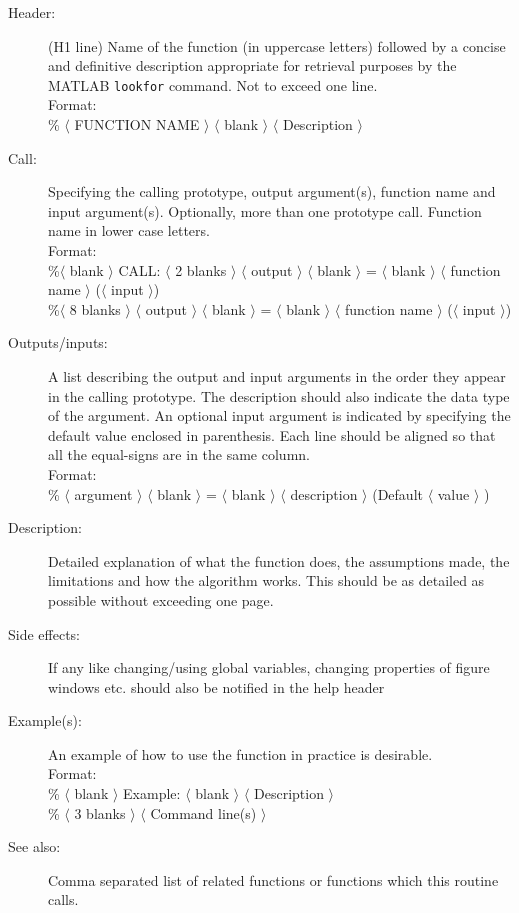 \documentclass[10pt,a4paper]{article}   %
\begin{document}
\begin{description}
\item[Header:] (H1 line) Name of the function (in uppercase letters) followed by a
  concise and definitive description appropriate for retrieval purposes by
  the MATLAB \verb+lookfor+ command. Not to exceed one line.  \\
  Format: \\
\% $\langle$ FUNCTION NAME $\rangle $
  $\langle$ blank $\rangle $ $\langle$ Description $\rangle$
\item[Call:] Specifying the calling prototype, \ie output argument(s),
  function name and input argument(s). Optionally, more than one
  prototype call. Function name in lower case letters. \\
  Format:\\
 \%$\langle$ blank $\rangle $ CALL: $\langle$ 2 blanks $\rangle$
  $\langle$ output $\rangle $ $\langle$ blank $\rangle $ = $\langle$ blank $\rangle$
  $\langle$ function name $\rangle$ ($\langle$ input $\rangle$) \\
 \%$\langle$ 8 blanks $\rangle$ 
  $\langle$ output $\rangle $ $\langle$ blank $\rangle $ = $\langle$ blank $\rangle$
  $\langle$ function name $\rangle$ ($\langle$ input $\rangle$)
\item[Outputs/inputs:] A list describing the output and input arguments in
  the order they appear in the calling prototype. The description should
  also indicate the data type of the argument. An optional input argument is
  indicated by specifying the default value enclosed in parenthesis. Each
  line should be aligned so that all the equal-signs are in the same column.\\
  Format: \\
  \%  $\langle$ argument $\rangle$
  $\langle$ blank $\rangle$ = $\langle$ blank $\rangle$ $\langle$ description
  $\rangle$ (Default $\langle$ value $\rangle$ )
\item[Description:] Detailed explanation of what the function does, the
  assumptions made, the limitations and how the algorithm works.  This
  should be as detailed as possible without exceeding one page.
\item[Side effects:] If any like changing/using global variables, 
changing properties of figure windows etc.
should also be notified in the help header
\item[Example(s):] An example of how to use the function in practice is
  desirable.\\
  Format: \\
\% $\langle$ blank $\rangle$ Example: $\langle$ blank $\rangle$ $\langle$ Description $\rangle$ \\
\% $\langle$ 3 blanks $\rangle$ $\langle$ Command line(s) $\rangle$  \\
\item[See also:] Comma separated list of related functions or functions
  which this routine calls.
\end{description}
\end{document}
